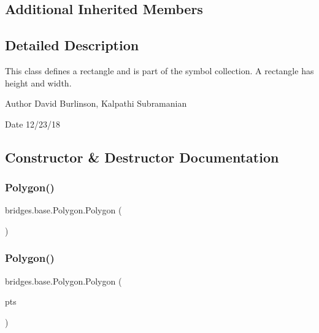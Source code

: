 \subsection*{Additional Inherited Members}


\subsection{Detailed Description}
This class defines a rectangle and is part of the symbol collection. A rectangle has height and width. 

\begin{DoxyAuthor}{Author}
David Burlinson, Kalpathi Subramanian 
\end{DoxyAuthor}
\begin{DoxyDate}{Date}
12/23/18 
\end{DoxyDate}


\subsection{Constructor \& Destructor Documentation}
\mbox{\label{classbridges_1_1base_1_1_polygon_af0c1b3bc3147ffbda98fd9c515a8052d}} 
\subsubsection{\texorpdfstring{Polygon()}{Polygon()}\hspace{0.1cm}{\footnotesize\ttfamily [1/2]}}
{\footnotesize\ttfamily bridges.\+base.\+Polygon.\+Polygon (\begin{DoxyParamCaption}{ }\end{DoxyParamCaption})}

\mbox{\label{classbridges_1_1base_1_1_polygon_a341cc297ba7f0f201d31aa3c98ecf108}} 
\subsubsection{\texorpdfstring{Polygon()}{Polygon()}\hspace{0.1cm}{\footnotesize\ttfamily [2/2]}}
{\footnotesize\ttfamily bridges.\+base.\+Polygon.\+Polygon (\begin{DoxyParamCaption}\item[{Array\+List$<$ Float $>$}]{pts }\end{DoxyParamCaption})}



